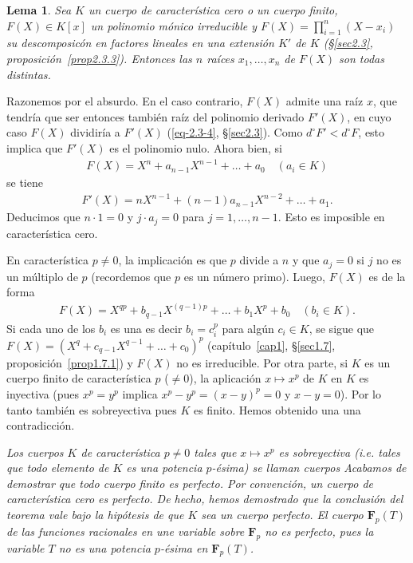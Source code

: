 \documentclass[bibtotoc,leqno,spanish]{amsbook}
\let\emph\relax %
\newcommand{\FF}{\mathbf{F}}
\numberwithin{equation}{section}
\newenvironment{comm}%
	{\begin{list}{}{\setlength{\leftmargin}{2\parindent}\setlength{\topsep}{\baselineskip}}\item\itshape}
	{\end{list}}
\theoremstyle{note}
\theoremstyle{note}
\newtheorem*{lemma*}{Lema}
\theoremstyle{rem}
\numberwithin{theorem}{section}
\numberwithin{proposition}{section}
\numberwithin{definition}{section}
\numberwithin{lemma}{section}
\numberwithin{corollary}{section}
\numberwithin{example}{section}
\numberwithin{footnote}{section}%
\begin{document}
\begin{lemma*}
Sea $K$ un cuerpo de caracter\'istica cero o un cuerpo finito, $F(X)\in K[x]$ un polinomio m\'onico
irreducible y $F(X) = \prod_{i=1}^{n}(X-x_{i})$ su descomposic\'on en factores lineales en una extensi\'on
$K'$ de $K$ (\S\ref{sec2.3}, proposici\'on~\ref{prop2.3.3}). Entonces
las $n$ ra\'ices $x_{1},\dots,x_{n}$ de $F(X)$ son todas distintas.
\end{lemma*}

Razonemos por el absurdo. En el caso contrario, $F(X)$ admite una ra\'iz \emph{m\'ultiple} $x$, que
tendr\'ia que ser entonces tambi\'en ra\'iz del polinomio derivado $F'(X)$, en cuyo caso $F(X)$
dividir\'ia a $F'(X)$ (\eqref{eq-2.3-4}, \S\ref{sec2.3}). Como $d^{\circ}F' < d^{\circ}F$, esto implica que $F'(X)$ es el
polinomio nulo. Ahora bien, si
\begin{gather*}
F(X) = X^{n}+a_{n-1}X^{n-1}+\dots+a_{0}\quad(a_{i}\in K)
\end{gather*}
se tiene
\begin{gather*}
F'(X) = nX^{n-1}+(n-1)a_{n-1}X^{n-2}+\dots+a_{1}.
\end{gather*}
Deducimos que $n\cdot 1 = 0$ y $j\cdot a_{j} = 0$ para $j=1,\dots,n-1$. Esto es imposible en caracter\'istica
cero.

En caracter\'istica $p\neq 0$, la implicaci\'on es que $p$ divide a $n$ y que $a_{j} = 0$ si $j$ no es
un m\'ultiplo de $p$ (recordemos que $p$ es un n\'umero primo). Luego, $F(X)$ es de la forma
\begin{gather*}
F(X) = X^{qp}+b_{q-1}X^{(q-1)p}+\dots+b_{1}X^{p}+b_{0}\quad(b_{i}\in K).
\end{gather*}
Si cada uno de los $b_{i}$ es una \emph{potencia $p$-\'esima,} es decir $b_{i} = c_{i}^{p}$ para
alg\'un $c_{i}\in K$, se sigue que $F(X) = (X^{q}+c_{q-1}X^{q-1}+\dots+c_{0})^{p}$ (cap\'itulo~\ref{cap1}, \S\ref{sec1.7},
proposici\'on~\ref{prop1.7.1}) y $F(X)$ no es irreducible. Por otra parte, si $K$ es un cuerpo finito de caracter\'istica $p$
($\neq 0$), la aplicaci\'on $x\mapsto x^{p}$ de $K$ en $K$ es inyectiva (pues
$x^{p}=y^{p}$ implica $x^{p}-y^{p} = (x-y)^{p} = 0$ y $x-y=0$). Por lo tanto tambi\'en es sobreyectiva
pues $K$ es finito. Hemos obtenido una una contradicci\'on.

\begin{comm}
Los cuerpos $K$ de caracter\'istica $p\neq 0$ tales que $x\mapsto x^{p}$ es sobreyectiva
(i.e. tales que todo elemento de $K$ es una potencia $p$-\'esima) se llaman cuerpos \emph{perfectos.}
Acabamos de demostrar que todo cuerpo finito es perfecto. Por convenci\'on, un cuerpo de caracter\'istica
cero es perfecto. De hecho, hemos demostrado que la conclusi\'on del teorema vale bajo la hip\'otesis
de que $K$ sea un cuerpo perfecto. El cuerpo $\FF_{p}(T)$ de las funciones racionales en une variable
sobre $\FF_{p}$ no es perfecto, pues la variable $T$ no es una potencia $p$-\'esima en $\FF_{p}(T)$.
\end{comm}
\end{document}
